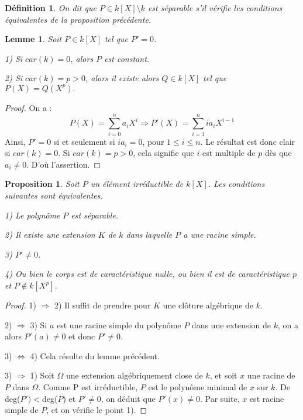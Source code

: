 \documentclass[12pt,a4paper]{report}
\newtheorem{lem}[thm]{\bf Lemme}
\newtheorem{prop}[thm]{\bf Proposition}
\newtheorem{defn}[thm]{\bf D\'efinition}
\begin{document}
\begin{defn}\rm
On dit que $P \in k[X]\setminus k$ est séparable s'il vérifie les conditions équivalentes de la proposition précédente.

\end{defn}

\begin{lem}\rm
Soit $P \in k[X]$ tel que $P'=0$. 

1) Si $car(k)=0$, alors $P$ est constant.

2) Si $car(k)=p>0$, alors il existe alors $Q \in k[X]$ tel que $P(X)=Q(X^{p}).$
\end{lem}

\begin{proof}
On a : 
$$P(X)=\sum_{i=0}^{n}a_{i}X^{i} \Rightarrow P'(X)=\sum_{i=1}^{n}ia_{i}X^{i-1}$$
Ainsi, $P'=0$ si et seulement si $ia_{i}=0$, pour $1\leq i\leq n$. Le résultat est donc clair si $car(k)=0$. Si $car(k)=p>0$, cela signifie que $i$ est multiple de $p$ dès que $a_{i} \neq 0$. D'où l'assertion. 
\end{proof}

\begin{prop}\rm
Soit $P$ un élément irréductible de $k[X]$. Les conditions suivantes sont équivalentes. 

1) Le polynôme $P$ est séparable. 

2) Il existe une extension $K$ de $k$ dans laquelle $P$ a une racine simple. 

3) $P'\neq 0$.

4) Ou bien le corps est de caractéristique nulle, ou bien il est de caractéristique $p$ et $P \notin k[X^{p}]$. 

\end{prop}

\begin{proof}
1) $\Rightarrow$ 2) Il suffit de prendre pour $K$ une clôture algébrique de $k$.

2) $\Rightarrow$ 3) Si $a$ est une racine simple du polynôme $P$ dans une extension de $k$, on a alors $P'(a)\neq 0$ et donc $P'\neq 0$. 

3) $\Leftrightarrow$ 4) Cela résulte du lemme précédent. 

3) $\Rightarrow$ 1) Soit $\Omega$ une extension algébriquement close de $k$, et soit $x$ une racine de $P$ dans $\Omega$. Comme P est irréductible, $P$ est le polynôme minimal de $x$ sur $k$. De deg($P')<$deg($P$) et $P'\neq 0$, on déduit que $P'(x)\neq 0$. Par suite, $x$ est racine simple de $P$, et on vérifie le point 1). 

\end{proof}
\end{document}
